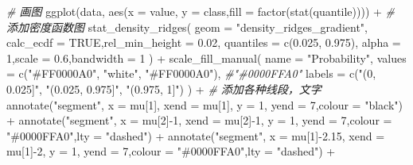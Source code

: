 \documentclass[
]{book}
\newenvironment{Shaded}{\begin{snugshade}}{\end{snugshade}}
\newcommand{\AttributeTok}[1]{\textcolor[rgb]{0.77,0.63,0.00}{#1}}
\newcommand{\CommentTok}[1]{\textcolor[rgb]{0.56,0.35,0.01}{\textit{#1}}}
\newcommand{\ConstantTok}[1]{\textcolor[rgb]{0.00,0.00,0.00}{#1}}
\newcommand{\DecValTok}[1]{\textcolor[rgb]{0.00,0.00,0.81}{#1}}
\newcommand{\FloatTok}[1]{\textcolor[rgb]{0.00,0.00,0.81}{#1}}
\newcommand{\FunctionTok}[1]{\textcolor[rgb]{0.00,0.00,0.00}{#1}}
\newcommand{\NormalTok}[1]{#1}
\newcommand{\SpecialCharTok}[1]{\textcolor[rgb]{0.00,0.00,0.00}{#1}}
\newcommand{\StringTok}[1]{\textcolor[rgb]{0.31,0.60,0.02}{#1}}
\begin{document}
\begin{Shaded}
\begin{Highlighting}[]
\CommentTok{\# 画图}
\FunctionTok{ggplot}\NormalTok{(data, }\FunctionTok{aes}\NormalTok{(}\AttributeTok{x =}\NormalTok{ value, }\AttributeTok{y =}\NormalTok{ class,}\AttributeTok{fill =} \FunctionTok{factor}\NormalTok{(}\FunctionTok{stat}\NormalTok{(quantile)))) }\SpecialCharTok{+} 
  \CommentTok{\# 添加密度函数图}
  \FunctionTok{stat\_density\_ridges}\NormalTok{(}
    \AttributeTok{geom =} \StringTok{"density\_ridges\_gradient"}\NormalTok{,}
    \AttributeTok{calc\_ecdf =} \ConstantTok{TRUE}\NormalTok{,}\AttributeTok{rel\_min\_height =} \FloatTok{0.02}\NormalTok{,}
    \AttributeTok{quantiles =} \FunctionTok{c}\NormalTok{(}\FloatTok{0.025}\NormalTok{, }\FloatTok{0.975}\NormalTok{),}
    \AttributeTok{alpha =} \DecValTok{1}\NormalTok{,}\AttributeTok{scale =} \FloatTok{0.6}\NormalTok{,}\AttributeTok{bandwidth =} \DecValTok{1}
\NormalTok{  ) }\SpecialCharTok{+}
  \FunctionTok{scale\_fill\_manual}\NormalTok{(}
    \AttributeTok{name =} \StringTok{"Probability"}\NormalTok{, }\AttributeTok{values =} \FunctionTok{c}\NormalTok{(}\StringTok{"\#FF0000A0"}\NormalTok{, }\StringTok{"white"}\NormalTok{, }\StringTok{"\#FF0000A0"}\NormalTok{), }\CommentTok{\#"\#0000FFA0"}
    \AttributeTok{labels =} \FunctionTok{c}\NormalTok{(}\StringTok{"(0, 0.025]"}\NormalTok{, }\StringTok{"(0.025, 0.975]"}\NormalTok{, }\StringTok{"(0.975, 1]"}\NormalTok{)}
\NormalTok{  ) }\SpecialCharTok{+} 
  \CommentTok{\# 添加各种线段，文字}
  \FunctionTok{annotate}\NormalTok{(}\StringTok{"segment"}\NormalTok{, }\AttributeTok{x =}\NormalTok{ mu[}\DecValTok{1}\NormalTok{], }\AttributeTok{xend =}\NormalTok{ mu[}\DecValTok{1}\NormalTok{], }\AttributeTok{y =} \DecValTok{1}\NormalTok{, }\AttributeTok{yend =} \DecValTok{7}\NormalTok{,}\AttributeTok{colour =} \StringTok{"black"}\NormalTok{) }\SpecialCharTok{+}
  \FunctionTok{annotate}\NormalTok{(}\StringTok{"segment"}\NormalTok{, }\AttributeTok{x =}\NormalTok{ mu[}\DecValTok{2}\NormalTok{]}\SpecialCharTok{{-}}\DecValTok{1}\NormalTok{, }\AttributeTok{xend =}\NormalTok{ mu[}\DecValTok{2}\NormalTok{]}\SpecialCharTok{{-}}\DecValTok{1}\NormalTok{, }\AttributeTok{y =} \DecValTok{1}\NormalTok{, }\AttributeTok{yend =} \DecValTok{7}\NormalTok{,}\AttributeTok{colour =} \StringTok{"\#0000FFA0"}\NormalTok{,}\AttributeTok{lty =} \StringTok{"dashed"}\NormalTok{) }\SpecialCharTok{+}
  \FunctionTok{annotate}\NormalTok{(}\StringTok{"segment"}\NormalTok{, }\AttributeTok{x =}\NormalTok{ mu[}\DecValTok{1}\NormalTok{]}\SpecialCharTok{{-}}\FloatTok{2.15}\NormalTok{, }\AttributeTok{xend =}\NormalTok{ mu[}\DecValTok{1}\NormalTok{]}\SpecialCharTok{{-}}\DecValTok{2}\NormalTok{, }\AttributeTok{y =} \DecValTok{1}\NormalTok{, }\AttributeTok{yend =} \DecValTok{7}\NormalTok{,}\AttributeTok{colour =} \StringTok{"\#0000FFA0"}\NormalTok{,}\AttributeTok{lty =} \StringTok{"dashed"}\NormalTok{) }\SpecialCharTok{+}

\end{Highlighting}
\end{Shaded}
\end{document}
